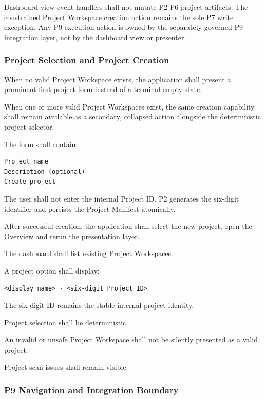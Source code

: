 Dashboard-view event handlers shall not mutate P2-P6 project artifacts. The constrained Project Workspace creation action remains the sole P7 write exception. Any P9 execution action is owned by the separately governed P9 integration layer, not by the dashboard view or presenter.

\hypertarget{project-selection-and-project-creation}{%
\subsubsection{Project Selection and Project Creation}\label{project-selection-and-project-creation}}

When no valid Project Workspace exists, the application shall present a prominent first-project form instead of a terminal empty state.

When one or more valid Project Workspaces exist, the same creation capability shall remain available as a secondary, collapsed action alongside the deterministic project selector.

The form shall contain:

\begin{verbatim}
Project name
Description (optional)
Create project
\end{verbatim}

The user shall not enter the internal Project ID. P2 generates the six-digit identifier and persists the Project Manifest atomically.

After successful creation, the application shall select the new project, open the Overview and rerun the presentation layer.

The dashboard shall list existing Project Workspaces.

A project option shall display:

\begin{verbatim}
<display name> · <six-digit Project ID>
\end{verbatim}

The six-digit ID remains the stable internal project identity.

Project selection shall be deterministic.

An invalid or unsafe Project Workspace shall not be silently presented as a valid project.

Project scan issues shall remain visible.

\hypertarget{p9-navigation-and-integration-boundary}{%
\subsubsection{P9 Navigation and Integration Boundary}\label{p9-navigation-and-integration-boundary}}


